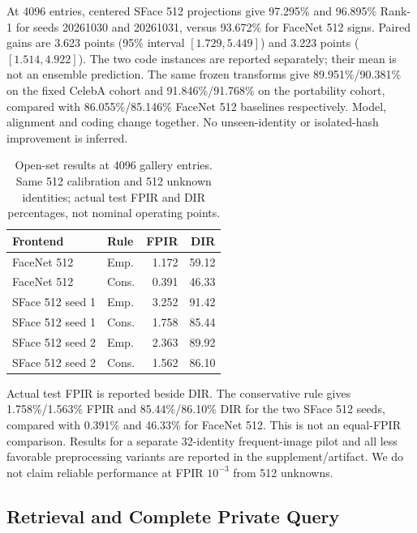 At 4096 entries, centered SFace 512 projections give 97.295\% and 96.895\% Rank-1 for seeds 20261030 and 20261031, versus 93.672\% for FaceNet 512 signs. Paired gains are 3.623 points (95\% interval $[1.729,5.449]$) and 3.223 points ($[1.514,4.922]$). The two code instances are reported separately; their mean is not an ensemble prediction. The same frozen transforms give 89.951\%/90.381\% on the fixed CelebA cohort and 91.846\%/91.768\% on the portability cohort, compared with 86.055\%/85.146\% FaceNet 512 baselines respectively. Model, alignment and coding change together. No unseen-identity or isolated-hash improvement is inferred.

\begin{table}[t]
\caption{Open-set results at 4096 gallery entries. Same 512 calibration and 512 unknown identities; actual test FPIR and DIR percentages, not nominal operating points.}
\label{tab:v3open}\centering\small
\setlength{\tabcolsep}{3pt}
\begin{tabular}{llrr}
\toprule
Frontend & Rule & FPIR & DIR \\
\midrule
FaceNet 512 & Emp. & 1.172 & 59.12 \\
FaceNet 512 & Cons. & 0.391 & 46.33 \\
SFace 512 seed 1 & Emp. & 3.252 & 91.42 \\
SFace 512 seed 1 & Cons. & 1.758 & 85.44 \\
SFace 512 seed 2 & Emp. & 2.363 & 89.92 \\
SFace 512 seed 2 & Cons. & 1.562 & 86.10 \\
\bottomrule
\end{tabular}
\end{table}

Actual test FPIR is reported beside DIR. The conservative rule gives 1.758\%/1.563\% FPIR and 85.44\%/86.10\% DIR for the two SFace 512 seeds, compared with 0.391\% and 46.33\% for FaceNet 512. This is not an equal-FPIR comparison. Results for a separate 32-identity frequent-image pilot and all less favorable preprocessing variants are reported in the supplement/artifact. We do not claim reliable performance at FPIR $10^{-3}$ from 512 unknowns.

\subsection{Retrieval and Complete Private Query}\label{sec:query_results}

